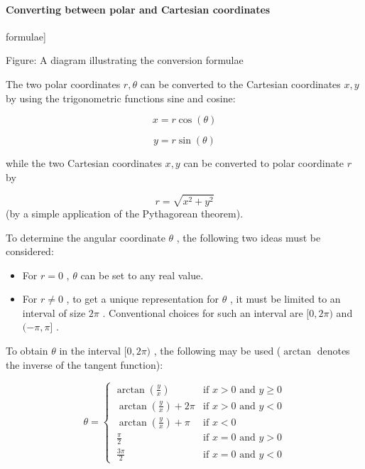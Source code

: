\paragraph{Converting between polar and Cartesian coordinates}




formulae]



Figure: A diagram illustrating the conversion formulae



The two polar coordinates $r,\theta$ can be converted to the Cartesian coordinates $x,y$ by using the trigonometric functions sine and cosine:



$$x=r\cos(\theta)$$



$$y=r\sin(\theta)$$



while the two Cartesian coordinates $x,y$ can be converted to polar coordinate $r$ by



$$r=\sqrt{x^2+y^2}$$ (by a simple application of the Pythagorean theorem).



To determine the angular coordinate $\theta$ , the following two ideas must be considered:



\begin{itemize}
    \item For $r=0$ , $\theta$ can be set to any real value.
    \item For $r\ne0$ , to get a unique representation for $\theta$ , it must be limited to an interval of size $2\pi$ . Conventional choices for such an interval are $[0,2\pi)$ and $(-\pi,\pi]$ .
\end{itemize}

To obtain $\theta$ in the interval $[0,2\pi)$ , the following may be used ($\arctan$ denotes the inverse of the tangent function):



$$\theta=

\begin{cases}

\arctan\left(\frac{y}{x}\right) & \text{if }x>0\text{ and }y \ge 0 \\\ \arctan\left(\frac{y}{x}\right)+2\pi & \text{if }x>0\text{ and }y < 0 \\\ \arctan \left(\frac{y}{x} \right)+\pi & \text{if } x < 0 \\\ \frac{\pi}{2} & \text{if }x=0\text{ and }y > 0 \\\ \frac{3\pi}{2} & \text{if }x=0\text{ and }y < 0

\end{cases}$$



